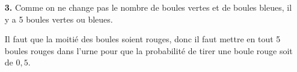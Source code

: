 \documentclass[10pt]{article}
\begin{document}
\begin{enumerate}
\item[\textbf{3.}] Comme on ne change pas le nombre de boules vertes et de boules bleues, il y a 5 boules vertes ou bleues.

Il faut que la moitié des boules soient rouges, donc il faut mettre en tout 5 boules rouges dans l'urne pour que la probabilité de tirer une boule rouge soit de $0,5$.
\end{enumerate}

\newpage
\end{document}
